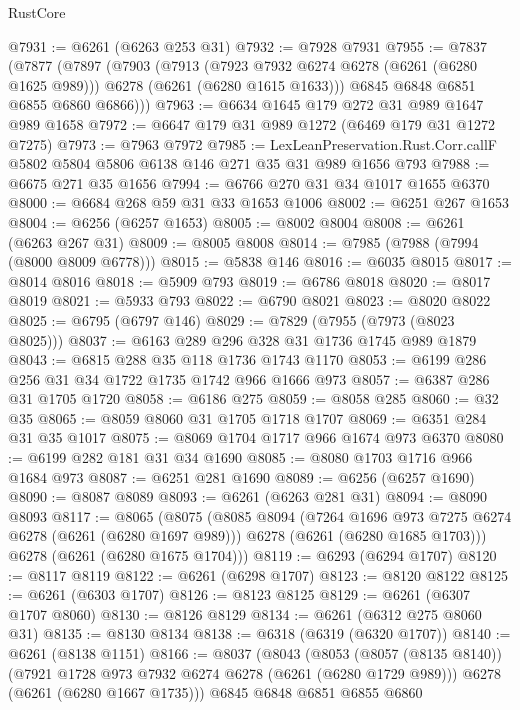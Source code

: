 \begin{lexlean}{RustCore}
\begin{coremodule}
@7931 := @6261 (@6263 @253 @31)
@7932 := @7928 @7931
@7955 := @7837
    (@7877
      (@7897
        (@7903
          (@7913
            (@7923 @7932 @6274 @6278 (@6261 (@6280 @1625 @989)))
            @6278
            (@6261 (@6280 @1615 @1633)))
          @6845
          @6848
          @6851
          @6855
          @6860
          @6866)))
@7963 := @6634 @1645 @179 @272 @31 @989 @1647 @989 @1658
@7972 := @6647 @179 @31 @989 @1272 (@6469 @179 @31 @1272 @7275)
@7973 := @7963 @7972
@7985 := LexLeanPreservation.Rust.Corr.callF
    @5802
    @5804
    @5806
    @6138
    @146
    @271
    @35
    @31
    @989
    @1656
    @793
@7988 := @6675 @271 @35 @1656
@7994 := @6766 @270 @31 @34 @1017 @1655 @6370
@8000 := @6684 @268 @59 @31 @33 @1653 @1006
@8002 := @6251 @267 @1653
@8004 := @6256 (@6257 @1653)
@8005 := @8002 @8004
@8008 := @6261 (@6263 @267 @31)
@8009 := @8005 @8008
@8014 := @7985 (@7988 (@7994 (@8000 @8009 @6778)))
@8015 := @5838 @146
@8016 := @6035 @8015
@8017 := @8014 @8016
@8018 := @5909 @793
@8019 := @6786 @8018
@8020 := @8017 @8019
@8021 := @5933 @793
@8022 := @6790 @8021
@8023 := @8020 @8022
@8025 := @6795 (@6797 @146)
@8029 := @7829 (@7955 (@7973 (@8023 @8025)))
@8037 := @6163 @289 @296 @328 @31 @1736 @1745 @989 @1879
@8043 := @6815 @288 @35 @118 @1736 @1743 @1170
@8053 := @6199 @286 @256 @31 @34 @1722 @1735 @1742 @966 @1666 @973
@8057 := @6387 @286 @31 @1705 @1720
@8058 := @6186 @275
@8059 := @8058 @285
@8060 := @32 @35
@8065 := @8059 @8060 @31 @1705 @1718 @1707
@8069 := @6351 @284 @31 @35 @1017
@8075 := @8069 @1704 @1717 @966 @1674 @973 @6370
@8080 := @6199 @282 @181 @31 @34 @1690
@8085 := @8080 @1703 @1716 @966 @1684 @973
@8087 := @6251 @281 @1690
@8089 := @6256 (@6257 @1690)
@8090 := @8087 @8089
@8093 := @6261 (@6263 @281 @31)
@8094 := @8090 @8093
@8117 := @8065
    (@8075
      (@8085
        @8094
        (@7264 @1696 @973 @7275 @6274 @6278 (@6261 (@6280 @1697 @989)))
        @6278
        (@6261 (@6280 @1685 @1703)))
      @6278
      (@6261 (@6280 @1675 @1704)))
@8119 := @6293 (@6294 @1707)
@8120 := @8117 @8119
@8122 := @6261 (@6298 @1707)
@8123 := @8120 @8122
@8125 := @6261 (@6303 @1707)
@8126 := @8123 @8125
@8129 := @6261 (@6307 @1707 @8060)
@8130 := @8126 @8129
@8134 := @6261 (@6312 @275 @8060 @31)
@8135 := @8130 @8134
@8138 := @6318 (@6319 (@6320 @1707))
@8140 := @6261 (@8138 @1151)
@8166 := @8037
    (@8043
      (@8053
        (@8057 (@8135 @8140))
        (@7921 @1728 @973 @7932 @6274 @6278 (@6261 (@6280 @1729 @989)))
        @6278
        (@6261 (@6280 @1667 @1735)))
      @6845
      @6848
      @6851
      @6855
      @6860

\end{coremodule}
\end{lexlean}
